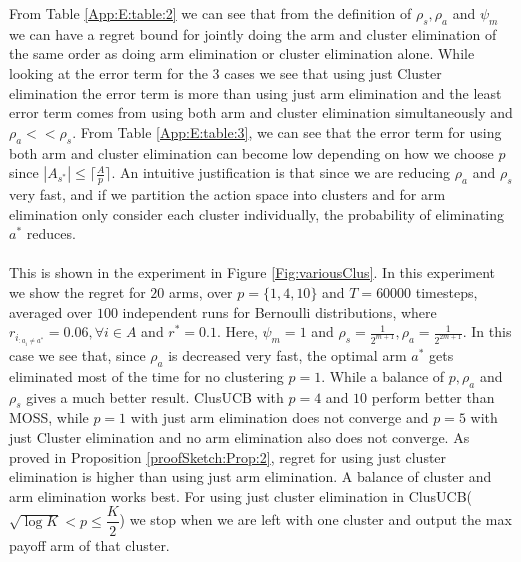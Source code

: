 \begin{remark}
\begin{table}
\begin{center}
\begin{tabular}{p{0.5cm}p{11cm}p{5cm}}
\end{tabular}
\end{center}	
\end{table}
From Table \ref{App:E:table:2} we can see that from the definition of $\rho_{s},\rho_{a}$ and $\psi_{m}$ we can have a regret bound for jointly doing the arm and cluster elimination of the same order as doing arm elimination or cluster elimination alone. While looking at the error term for the $3$ cases we see that using just Cluster elimination  the error term is more than using just arm elimination and the least error term comes from using both arm and cluster elimination simultaneously and $\rho_{a}<<\rho_{s}$. From Table \ref{App:E:table:3}, we can see that the error term for using both arm and cluster elimination can become low depending on how we choose $p$ since $|A_{s^{*}}|\leq \lceil\frac{A}{p}\rceil$. An intuitive justification is that since we are reducing $\rho_{a}$ and $\rho_{s}$ very fast, and if we partition the action space into clusters and for arm elimination only consider each cluster individually, the probability of eliminating $a^{*}$ reduces. 
\paragraph*{} This is shown in the experiment in Figure \ref{Fig:variousClus}. In this experiment we show the regret for $20$ arms, over $p=\lbrace 1,4,10\rbrace$ and $T=60000$ timesteps, averaged over $100$ independent runs for Bernoulli distributions, where $r_{i_{:{a_{i}\neq a^{*}}}}=0.06,\forall i\in A$ and $r^{*}=0.1$. Here, $\psi_{m}=1$ and $\rho_{s}=\frac{1}{2^{m+1}},\rho_{a}=\frac{1}{2^{2m+1}}$. In this case we see that, since $\rho_{a}$ is decreased very fast, the optimal arm $a^{*}$ gets eliminated most of the time for no clustering $p=1$. While a balance of $p,\rho_{a}$ and $\rho_{s}$ gives a much better result. ClusUCB with $p=4$ and $10$ perform better than MOSS, while $p=1$ with just arm elimination does not converge and $p=5$ with just Cluster elimination and no arm elimination also does not converge. As proved in Proposition \ref{proofSketch:Prop:2}, regret for using just cluster elimination is higher than using just arm elimination. A balance of cluster and arm elimination works best. For using just cluster elimination in ClusUCB($\sqrt{\log K}<p\leq \dfrac{K}{2}$) we stop when we are left with one cluster and output the max payoff arm of that cluster.


\end{remark}
